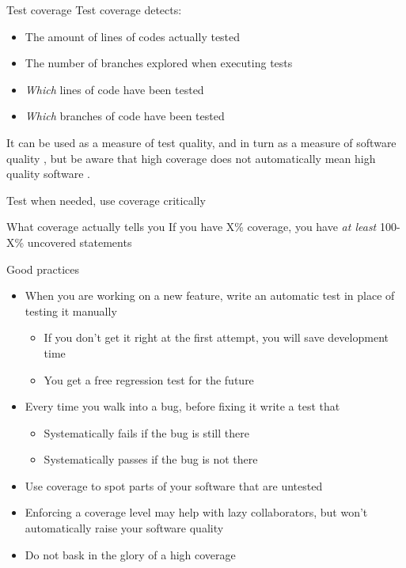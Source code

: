 \documentclass[presentation]{beamer}
\begin{document}
\begin{frame}[fragile]{Test coverage}
    Test coverage detects:
    \begin{itemize}
        \item The amount of lines of codes actually tested
        \item The number of branches explored when executing tests
        \item \textit{Which} lines of code have been tested
        \item \textit{Which} branches of code have been tested
    \end{itemize}
    It can be used as a measure of test quality, and in turn as a measure of software quality \cite{Horgan1994}, but be aware that high coverage does not automatically mean high quality software \cite{Inozemtseva2014}. 
\end{frame}

\begin{frame}[fragile]{Test when needed, use coverage critically}
    \begin{block}{What coverage actually tells you}
        If you have X\% coverage, you have \textit{at least} 100-X\% uncovered statements
    \end{block}
    Good practices
    \begin{itemize}
        \item When you are working on a new feature, write an automatic test in place of testing it manually
        \begin{itemize}
            \item If you don't get it right at the first attempt, you will save development time
            \item You get a free regression test for the future
        \end{itemize}
        \item Every time you walk into a bug, before fixing it write a test that
        \begin{itemize}
            \item Systematically fails if the bug is still there
            \item Systematically passes if the bug is not there
        \end{itemize}
        \item Use coverage to spot parts of your software that are untested
        \item Enforcing a coverage level may help with lazy collaborators, but won't automatically raise your software quality
        \item Do not bask in the glory of a high coverage
    \end{itemize}
\end{frame}
\end{document}
